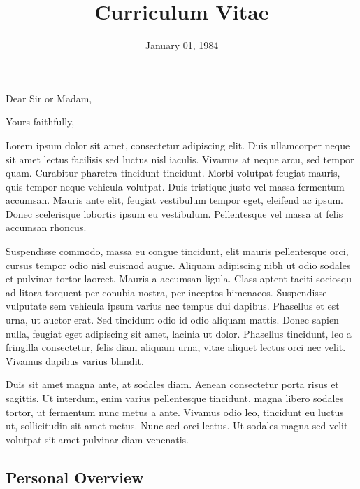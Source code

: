 \documentclass[11pt,letterpaper,sans]{moderncv} %
\title{Curriculum Vitae}
\begin{document}
\date{January 01, 1984}
\opening{Dear Sir or Madam,}
\closing{Yours faithfully,}

\makelettertitle
Lorem ipsum dolor sit amet, consectetur adipiscing elit. Duis ullamcorper neque sit amet lectus facilisis sed luctus nisl iaculis. Vivamus at neque arcu, sed tempor quam. Curabitur pharetra tincidunt tincidunt. Morbi volutpat feugiat mauris, quis tempor neque vehicula volutpat. Duis tristique justo vel massa fermentum accumsan. Mauris ante elit, feugiat vestibulum tempor eget, eleifend ac ipsum. Donec scelerisque lobortis ipsum eu vestibulum. Pellentesque vel massa at felis accumsan rhoncus.

Suspendisse commodo, massa eu congue tincidunt, elit mauris pellentesque orci, cursus tempor odio nisl euismod augue. Aliquam adipiscing nibh ut odio sodales et pulvinar tortor laoreet. Mauris a accumsan ligula. Class aptent taciti sociosqu ad litora torquent per conubia nostra, per inceptos himenaeos. Suspendisse vulputate sem vehicula ipsum varius nec tempus dui dapibus. Phasellus et est urna, ut auctor erat. Sed tincidunt odio id odio aliquam mattis. Donec sapien nulla, feugiat eget adipiscing sit amet, lacinia ut dolor. Phasellus tincidunt, leo a fringilla consectetur, felis diam aliquam urna, vitae aliquet lectus orci nec velit. Vivamus dapibus varius blandit.

Duis sit amet magna ante, at sodales diam. Aenean consectetur porta risus et sagittis. Ut interdum, enim varius pellentesque tincidunt, magna libero sodales tortor, ut fermentum nunc metus a ante. Vivamus odio leo, tincidunt eu luctus ut, sollicitudin sit amet metus. Nunc sed orci lectus. Ut sodales magna sed velit volutpat sit amet pulvinar diam venenatis.

\makeletterclosing

\newpage

\makecvtitle{}




\subsection{Personal Overview}
\end{document}
